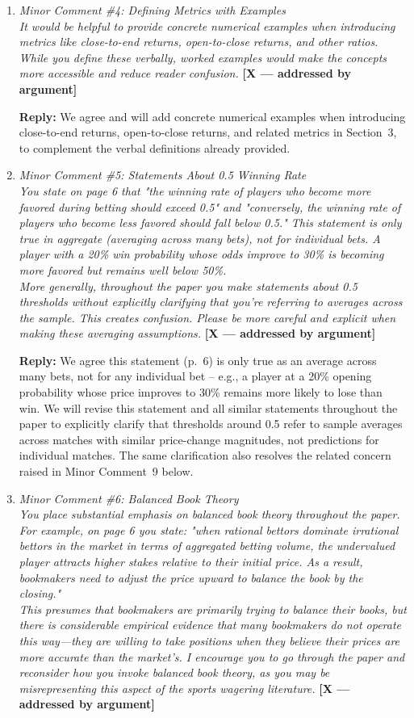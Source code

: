 \documentclass[letterpaper,12pt]{article}
\newcounter{b}
\newcommand{\argX}{\textcolor{green!55!black}{\textbf{[X --- addressed by argument]}}}
\newcommand{\Reply}[1]{\par\noindent\textbf{Reply:} #1}
\begin{document}
\begin{enumerate}
\item \textit{Minor Comment \#4: Defining Metrics with Examples\\[6pt]
It would be helpful to provide concrete numerical examples when introducing metrics like close-to-end returns, open-to-close returns, and other ratios. While you define these verbally, worked examples would make the concepts more accessible and reduce reader confusion.} \argX

\Reply{We agree and will add concrete numerical examples when introducing close-to-end returns, open-to-close returns, and related metrics in Section~3, to complement the verbal definitions already provided.}

\item \textit{Minor Comment \#5: Statements About 0.5 Winning Rate\\[6pt]
You state on page 6 that "the winning rate of players who become more favored during betting should exceed 0.5" and "conversely, the winning rate of players who become less favored should fall below 0.5." This statement is only true in aggregate (averaging across many bets), not for individual bets. A player with a 20\% win probability whose odds improve to 30\% is becoming more favored but remains well below 50\%.\\[6pt]
More generally, throughout the paper you make statements about 0.5 thresholds without explicitly clarifying that you're referring to averages across the sample. This creates confusion. Please be more careful and explicit when making these averaging assumptions.} \argX

\Reply{We agree this statement (p.~6) is only true as an average across many bets, not for any individual bet -- e.g., a player at a 20\% opening probability whose price improves to 30\% remains more likely to lose than win. We will revise this statement and all similar statements throughout the paper to explicitly clarify that thresholds around 0.5 refer to sample averages across matches with similar price-change magnitudes, not predictions for individual matches. The same clarification also resolves the related concern raised in Minor Comment~9 below.}

\item \textit{Minor Comment \#6: Balanced Book Theory\\[6pt]
You place substantial emphasis on balanced book theory throughout the paper. For example, on page 6 you state: "when rational bettors dominate irrational bettors in the market in terms of aggregated betting volume, the undervalued player attracts higher stakes relative to their initial price. As a result, bookmakers need to adjust the price upward to balance the book by the closing."\\[6pt]
This presumes that bookmakers are primarily trying to balance their books, but there is considerable empirical evidence that many bookmakers do not operate this way—they are willing to take positions when they believe their prices are more accurate than the market's. I encourage you to go through the paper and reconsider how you invoke balanced book theory, as you may be misrepresenting this aspect of the sports wagering literature.} \argX


\end{enumerate}
\end{document}
